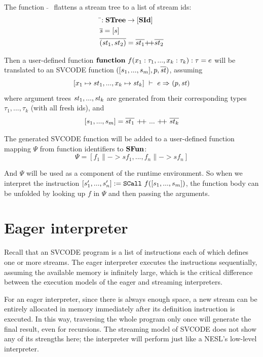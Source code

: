 The function $\bar{}$ \ flattens a stream tree to a list of stream ids:
	\begin{align*}
&\bar{}: \STree \-> [\SId] \\
&\overline{\s} = [s] \\
&\overline{(\st_1,st_2)} = \overline{st_1} {\++} \overline{st_2}
\end{align*}


Then a user-defined function $\*{function} \  f(x_1: \tau_1, ..., x_k: \tau_k): \tau = e $ will be translated to an SVCODE function
$([s_1,...,s_m], p, \ol{\st})$, 
assuming
 $$\Trans{[x_1 \|-> st_1,..., x_k \|-> \st_k ]}{e}{}{}{\sfun{p}{\st}}$$ 
where argument trees $\st_1,...,\st_k$  are generated from their corresponding types $\tau_1,...,\tau_k$ (with all fresh ids), and
$$[s_1,...,s_m] = \ol{st_1} \ {\++} \ ... \ {\++} \ \ol{st_k}$$




The generated SVCODE function will be added to a user-defined function mapping $\Psi$ from function identifiers to $\*{SFun}$:
$$ \Psi = [f_1 \|-> sf_1,...,f_n \|-> sf_n] $$

And $\Psi$ will be used as a component of the runtime environment. So when we interpret the instruction $\scall{f}{[s_1,...,s_m]}{[s_1',...,s_n']}$, the function body can be unfolded by looking up $f$ in $\Psi$ and then passing the arguments.

\section{Eager interpreter}
Recall that an SVCODE program is a list of instructions each of which defines one or more streams. 
The eager interpreter executes the instructions sequentially, assuming the available memory is infinitely large, which is the critical difference between the execution models of the eager and streaming interpreters.

For an eager interpreter, since there is always enough space, a  new stream can be entirely allocated in memory immediately after its definition instruction is executed.
In this way, traversing the whole program only once will generate the final result, even for recursions.
The streaming model of SVCODE does not show any of its strengths here; the interpreter will perform just like a NESL's low-level interpreter. 


